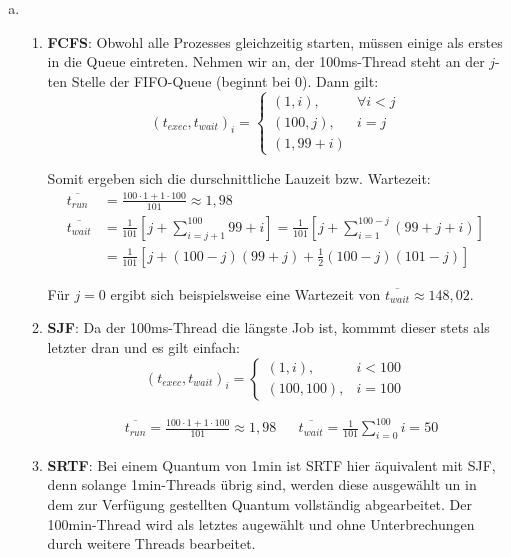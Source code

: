 \documentclass[numbers=noendperiod,10pt]{scrartcl}
\begin{document}
\begin{enumerate}[a)]
	\item \begin{enumerate}
		\item \textbf{FCFS}: Obwohl alle Prozesses gleichzeitig starten, müssen einige als erstes in die Queue eintreten. Nehmen wir an, der 100ms-Thread steht an der $j$-ten Stelle der FIFO-Queue (beginnt bei 0). Dann gilt:
		\begin{equation}
			(t_{exec},t_{wait})_i = \begin{cases}
				(1,i), &\forall i<j\\
				(100,j), &i = j\\
				(1,99+i)
			\end{cases}
		\end{equation}
		
		Somit ergeben sich die durschnittliche Lauzeit bzw. Wartezeit:
		\begin{align}
			\overline{t_{run}} &= \frac{100\cdot 1 + 1 \cdot 100}{101} \approx 1,98\\
			\overline{t_{wait}} &= \frac{1}{101}\left[j+ \sum_{i=j+1}^{100} 99 + i\right] = \frac{1}{101}\left[j + \sum_{i=1}^{100-j}(99 + j + i)\right]\\
			& = \frac{1}{101}\left[j + (100-j)(99+j) + \frac{1}{2}(100-j)(101-j)\right]
		\end{align}
		
		Für $j=0$ ergibt sich beispielsweise eine Wartezeit von $\overline{t_{wait}} \approx 148,02$.
		\item \textbf{SJF}: Da der 100ms-Thread die längste Job ist, kommmt dieser stets als letzter dran und es gilt einfach:
		\begin{equation}
			(t_{exec},t_{wait})_i = \begin{cases}
			(1,i), &i<100\\
			(100,100), &i=100
			\end{cases}
		\end{equation}
		
		\begin{align}
			&\overline{t_{run}} = \frac{100\cdot 1 + 1\cdot 100}{101} \approx 1,98 &&\overline{t_{wait}} = \frac{1}{101}\sum_{i=0}^{100} i = 50
		\end{align}
		\item \textbf{SRTF}: Bei einem Quantum von 1min ist SRTF hier äquivalent mit SJF, denn solange 1min-Threads übrig sind, werden diese ausgewählt un in dem zur Verfügung gestellten Quantum vollständig abgearbeitet. Der 100min-Thread wird als letztes augewählt und ohne Unterbrechungen durch weitere Threads bearbeitet.
		

\end{enumerate}
\end{enumerate}
\end{document}
